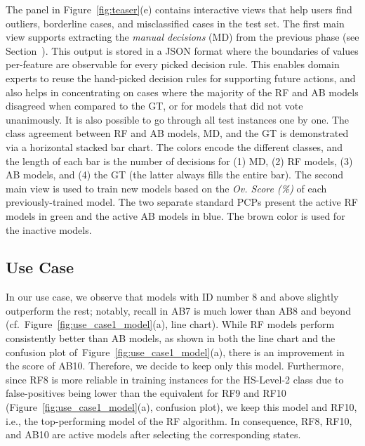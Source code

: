 The panel in Figure~\ref{fig:teaser}(e) contains interactive views that help users find outliers, borderline cases, and misclassified cases in the test set. The first main view supports extracting the \emph{manual decisions} (MD) from the previous phase (see Section~). This output is stored in a JSON format where the boundaries of values per-feature are observable for every picked decision rule. This enables domain experts to reuse the hand-picked decision rules for supporting future actions, and also helps in concentrating on cases where the majority of the RF and AB models disagreed when compared to the GT, or for models that did not vote unanimously. It is also possible to go through all test instances one by one. The class agreement between RF and AB models, MD, and the GT is demonstrated via a horizontal stacked bar chart. The colors encode the different classes, and the length of each bar is the number of decisions for (1) MD, (2) RF models, (3) AB models, and (4) the GT (the latter always fills the entire bar). 
The second main view is used to train new models based on the \emph{Ov. Score (\%)} of each previously-trained model. The two separate standard PCPs present the active RF models in green and the active AB models in blue. The brown color is used for the inactive models. %

\subsection{Use Case} \label{sec:application}

In our use case, we observe that models with ID number 8 and above slightly outperform the rest; notably, recall in AB7 is much lower than AB8 and beyond (cf.~Figure~\ref{fig:use_case1_model}(a), line chart). While RF models perform consistently better than AB models, as shown in both the line chart and the confusion plot of~Figure~\ref{fig:use_case1_model}(a), there is an improvement in the score of AB10. Therefore, we decide to keep only this model. Furthermore, since RF8 is more reliable in training instances for the HS-Level-2 class due to false-positives being lower than the equivalent for RF9 and RF10 (Figure~\ref{fig:use_case1_model}(a), confusion plot), we keep this model and RF10, i.e., the top-performing model of the RF algorithm. In consequence, RF8, RF10, and AB10 are active models after selecting the corresponding states. 

